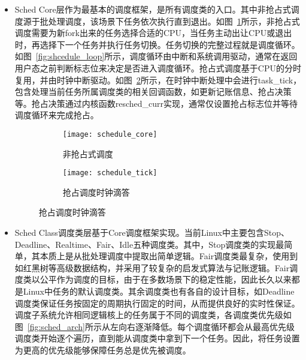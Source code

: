 \begin{itemize}

    \item Sched Core层作为最基本的调度框架，是所有调度类的入口。其中非抢占式调度源于批处理调度，该场景下任务依次执行直到退出。如图~\ref{fig:schedule_core}所示，非抢占式调度需要为新fork出来的任务选择合适的CPU，当任务主动出让CPU或退出时，再选择下一个任务并执行任务切换。任务切换的完整过程就是调度循环。如图~\ref{fig:shcedule_loop}所示，调度循环由中断和系统调用驱动，通常在返回用户态之前判断标志位来决定是否进入调度循环。抢占式调度基于CPU的分时复用，并由时钟中断驱动。如图~\ref{fig:schedule_tick}所示，在时钟中断处理中会进行task\_tick，包含处理当前任务所属调度类的相关回调函数，如更新记账信息、抢占决策等。抢占决策通过内核函数resched\_curr实现，通常仅设置抢占标志位并等待调度循环来完成抢占。

\begin{figure}[!htbp]
    \centering
    \begin{subfigure}[b]{0.42\textwidth}
        \texttt{[image: schedule\_core]}
        \caption{\quad 非抢占式调度}
        \label{fig:schedule_core}
    \end{subfigure}
    \hspace{0.5cm}
    \begin{subfigure}[b]{0.42\textwidth}
        \texttt{[image: schedule\_tick]}
        \caption{\quad 抢占调度时钟滴答}
        \label{fig:schedule_tick}
    \end{subfigure}
    \label{fig:cpu_series_memcached}
\end{figure}

    \item Sched Class调度类层基于Core调度框架实现。当前Linux中主要包含Stop、Deadline、Realtime、Fair、Idle五种调度类\citep{scheduler}。其中，Stop调度类的实现最简单，其本质上是从批处理调度中提取出简单逻辑。Fair调度类最复杂，使用到如红黑树等高级数据结构，并采用了较复杂的启发式算法与记账逻辑。Fair调度类以公平作为调度的目标，由于在多数场景下的稳定性能，因此长久以来都是Linux中任务的默认调度类。其余调度类也有各自的设计目标，如Deadline调度类保证任务按固定的周期执行固定的时间，从而提供良好的实时性保证。调度子系统允许相同逻辑核上的任务属于不同的调度类，各调度类优先级如图~\ref{fig:sched_arch}所示从左向右逐渐降低。每个调度循环都会从最高优先级调度类开始逐个遍历，直到能从调度类中拿到下一个任务。因此，将任务设置为更高的优先级能够保障任务总是优先被调度。


\end{itemize}
